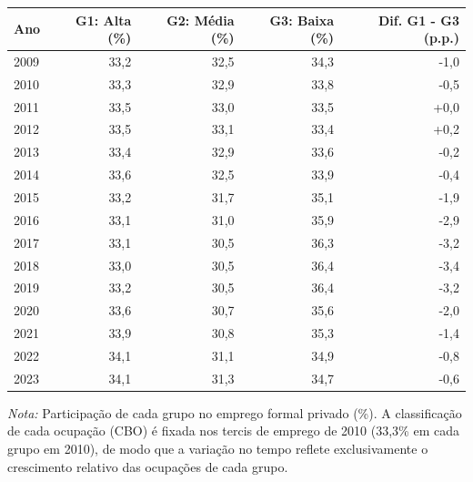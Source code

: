 \providecommand{\toprule}{\hline\hline}
\providecommand{\midrule}{\hline}
\providecommand{\bottomrule}{\hline\hline}
\providecommand{\addlinespace}[1][]{}
{\small
\renewcommand{\arraystretch}{1.12}
\begin{tabular}{lrrrr}
\toprule
Ano & G1: Alta (\%) & G2: Média (\%) & G3: Baixa (\%) & Dif. G1 - G3 (p.p.) \\
\midrule
2009 & 33,2 & 32,5 & 34,3 & -1,0 \\
2010 & 33,3 & 32,9 & 33,8 & -0,5 \\
2011 & 33,5 & 33,0 & 33,5 & +0,0 \\
2012 & 33,5 & 33,1 & 33,4 & +0,2 \\
2013 & 33,4 & 32,9 & 33,6 & -0,2 \\
2014 & 33,6 & 32,5 & 33,9 & -0,4 \\
2015 & 33,2 & 31,7 & 35,1 & -1,9 \\
2016 & 33,1 & 31,0 & 35,9 & -2,9 \\
2017 & 33,1 & 30,5 & 36,3 & -3,2 \\
2018 & 33,0 & 30,5 & 36,4 & -3,4 \\
2019 & 33,2 & 30,5 & 36,4 & -3,2 \\
2020 & 33,6 & 30,7 & 35,6 & -2,0 \\
2021 & 33,9 & 30,8 & 35,3 & -1,4 \\
2022 & 34,1 & 31,1 & 34,9 & -0,8 \\
2023 & 34,1 & 31,3 & 34,7 & -0,6 \\
\bottomrule
\end{tabular}
\vspace{2pt}
\par{\footnotesize \textit{Nota:} Participação de cada grupo no emprego formal privado (\%). A classificação de cada ocupação (CBO) é fixada nos tercis de emprego de 2010 (33,3\% em cada grupo em 2010), de modo que a variação no tempo reflete exclusivamente o crescimento relativo das ocupações de cada grupo.}
}
